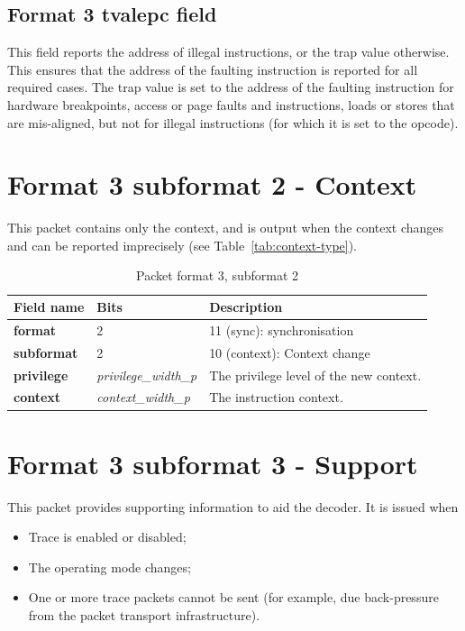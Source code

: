 \subsection{Format 3 \textbf{tvalepc} field}

This field reports the address of illegal instructions, or the trap value otherwise.  This ensures that
the address of the faulting instruction is reported for all required cases.  The trap value 
is set to the address of the faulting instruction for hardware breakpoints, access or page faults and 
instructions, loads or stores that are mis-aligned, but not for illegal instructions (for which it is set to the opcode).

\FloatBarrier
\section{Format 3 subformat 2 - Context} \label{sec:format32}

This packet contains only the context, and is output when the context changes and can be reported imprecisely (see Table~\ref{tab:context-type}).

\begin{table}[htp]
  \centering
  \caption{Packet format 3, subformat 2}
  \label{tab:te_inst3-2}
  \begin{tabulary}{\textwidth}{|l|p{35mm}|p{90mm}|}
    \hline
    {\bf Field name} & {\bf Bits} & {\bf Description} \\
    \hline
    \textbf{format} & 2 & 11 (sync): synchronisation\\
    \hline
    \textbf{subformat}  & 2 & 10 (context): Context change \\
    \hline
    \textbf{privilege} & \textit {privilege\_width\_p} & 
                The privilege level of the new context.\\
    \hline
    \textbf{context} &  \textit {context\_width\_p} & The instruction context. \\
    \hline
  \end{tabulary}
\end{table}

\section{Format 3 subformat 3 - Support} \label{sec:format33}

This packet provides supporting information to aid the decoder.  It is issued when

\begin{itemize}
  \item Trace is enabled or disabled;
  \item The operating mode changes;
  \item One or more trace packets cannot be sent (for example, due back-pressure from the packet transport infrastructure).
\end{itemize}

